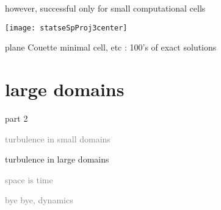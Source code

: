 %
%
%
%
%

%
%
%

\begin{frame}{however, successful only for {\Huge small} computational cells}
\begin{center}
\texttt{[image: statseSpProj3center]}
\end{center}
plane Couette minimal cell, etc : 100's of exact solutions
\end{frame}

\section[turbulence in large domains]
{large domains}
\begin{frame}{part 2}
\begin{enumerate}
              \item
    \textcolor{gray}{\small
turbulence in small domains
        }
              \item
    {\Large
turbulence in large domains
    }\textcolor{gray}{\small
              \item
\catlatt
              \item
space is time
              \item
bye bye, dynamics
                    }
            \end{enumerate}
\end{frame}


